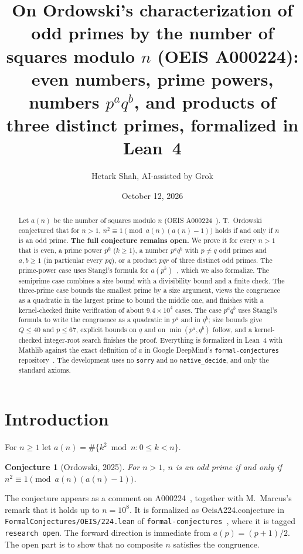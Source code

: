 \documentclass[11pt]{article}
\author{Hetark Shah, AI-assisted by Grok}
\date{October 12, 2026}
\title{On Ordowski's characterization of odd primes by the number of squares modulo $n$ (OEIS A000224): even numbers, prime powers, numbers $p^aq^b$, and products of three distinct primes, formalized in Lean~4}
\newtheorem{conjecture}[theorem]{Conjecture}
\theoremstyle{remark}\newtheorem{remark}[theorem]{Remark}
\newcommand{\lean}[1]{{\ttfamily\def\_{\textunderscore\allowbreak}\def\/{/\allowbreak}#1}}
\begin{document}
\maketitle
\begin{abstract}
Let $a(n)$ be the number of squares modulo $n$ (OEIS A000224~\cite{oeis}). T.~Ordowski conjectured that for $n>1$, $n^2\equiv1\pmod{a(n)(a(n)-1)}$ holds if and only if $n$ is an odd prime. \textbf{The full conjecture remains open.} We prove it for every $n>1$ that is even, a prime power $p^k$ ($k\ge1$), a number $p^aq^b$ with $p\ne q$ odd primes and $a,b\ge1$ (in particular every $pq$), or a product $pqr$ of three distinct odd primes. The prime-power case uses Stangl's formula for $a(p^k)$~\cite{stangl}, which we also formalize. The semiprime case combines a size bound with a divisibility bound and a finite check. The three-prime case bounds the smallest prime by a size argument, views the congruence as a quadratic in the largest prime to bound the middle one, and finishes with a kernel-checked finite verification of about $9.4\times10^4$ cases. The case $p^aq^b$ uses Stangl's formula to write the congruence as a quadratic in $p^a$ and in $q^b$; size bounds give $Q\le40$ and $p\le67$, explicit bounds on $q$ and on $\min(p^a,q^b)$ follow, and a kernel-checked integer-root search finishes the proof. Everything is formalized in Lean~4 with Mathlib against the exact definition of $a$ in Google DeepMind's \texttt{formal-conjectures} repository~\cite{fc}. The development uses no \texttt{sorry} and no \texttt{native\_decide}, and only the standard axioms.
\end{abstract}

\section{Introduction}
For $n\ge1$ let $a(n)=\#\{k^2\bmod n:0\le k<n\}$.
\begin{conjecture}[Ordowski, 2025]\label{conj}
For $n>1$, $n$ is an odd prime if and only if $n^2\equiv1\pmod{a(n)(a(n)-1)}$.
\end{conjecture}
The conjecture appears as a comment on A000224~\cite{oeis}, together with M.~Marcus's remark that it holds up to $n=10^8$. It is formalized as \lean{OeisA224.conjecture} in \nolinkurl{FormalConjectures/OEIS/224.lean} of \texttt{formal-conjectures}~\cite{fc}, where it is tagged \texttt{research open}. The forward direction is immediate from $a(p)=(p+1)/2$. The open part is to show that no composite $n$ satisfies the congruence.
\end{document}
